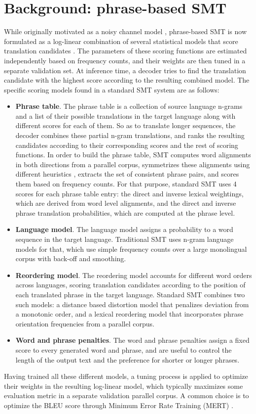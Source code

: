 \documentclass[11pt,a4paper]{article}
\begin{document}
\section{Background: phrase-based SMT} \label{sec:smt}

While originally motivated as a noisy channel model \citep{brown1990statistical}, phrase-based SMT is now formulated as a log-linear combination of several statistical models that score translation candidates \citep{koehn2003statistical}. The parameters of these scoring functions are estimated independently based on frequency counts, and their weights are then tuned in  a separate validation set. At inference time, a decoder tries to find the translation candidate with the highest score according to the resulting combined model. The specific scoring models found in a standard SMT system are as follows:
\begin{itemize}
\item \textbf{Phrase table}. The phrase table is a collection of source language n-grams and a list of their possible translations in the target language along with different scores for each of them. So as to translate longer sequences, the decoder combines these partial n-gram translations, and ranks the resulting candidates according to their corresponding scores and the rest of scoring functions. In order to build the phrase table, SMT computes word alignments in both directions from a parallel corpus, symmetrizes these alignments using different heuristics \citep{och2003systematic}, extracts the set of consistent phrase pairs, and scores them based on frequency counts. For that purpose, standard SMT uses 4 scores for each phrase table entry: the direct and inverse lexical weightings, which are derived from word level alignments, and the direct and inverse phrase translation probabilities, which are computed at the phrase level.
\item \textbf{Language model}. The language model assigns a probability to a word sequence in the target language. Traditional SMT uses n-gram language models for that, which use simple frequency counts over a large monolingual corpus with back-off and smoothing.
\item \textbf{Reordering model}. The reordering model accounts for different word orders across languages, scoring translation candidates according to the position of each translated phrase in the target language. Standard SMT combines two such models: a distance based distortion model that penalizes deviation from a monotonic order, and a lexical reordering model that incorporates phrase orientation frequencies from a parallel corpus.
\item \textbf{Word and phrase penalties}. The word and phrase penalties assign a fixed score to every generated word and phrase, and are useful to control the length of the output text and the preference for shorter or longer phrases.
\end{itemize}
Having trained all these different models, a tuning process is applied to optimize their weights in the resulting log-linear model, which typically maximizes some evaluation metric in a separate validation parallel corpus. A common choice is to optimize the BLEU score through Minimum Error Rate Training (MERT) \citep{och2003MERT}.
\end{document}
